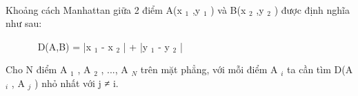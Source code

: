  

Khoảng cách Manhattan giữa 2 điểm A(x $_ 1 $ ,y $_ 1 $ ) và B(x $_ 2 $ ,y $_ 2 $ ) được định nghĩa như sau:

        D(A,B) = |x $_ 1 $ - x $_ 2 $ | + |y $_ 1 $ - y $_ 2 $ |

Cho N điểm A $_ 1 $ , A $_ 2 $ , ..., A $_ N $ trên mặt phẳng, với mỗi điểm A $_ i $ ta cần tìm D(A $_ i $ , A $_ j $ ) nhỏ nhất với j ≠ i.

\